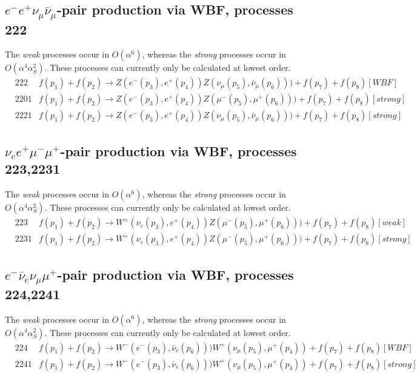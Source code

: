 \documentclass[12pt]{article}
\begin{document}
%
\subsection{$e^-e^+ \nu_{\mu} \bar\nu_{\mu} $-pair production via WBF, processes 222}
The {\it weak} processes occur in $O(\alpha^6)$, whereas the {\it strong} processes occur in $O(\alpha^4 \alpha_S^2)$.
These processes can currently only be calculated at lowest order.
\begin{eqnarray}
&222 &  f(p_1)+f(p_2) \to Z(e^-(p_3),e^+(p_4))Z(\nu_\mu(p_5),\bar{\nu}_\mu(p_6)))+f(p_7)+f(p_8) [WBF]  \nonumber \\
&2201 & f(p_1)+f(p_2) \to Z(e^-(p_3),e^+(p_4))Z(\mu^-(p_5),\mu^+(p_6)))+f(p_7)+f(p_8) [strong] \nonumber \\
&2221 & f(p_1)+f(p_2) \to Z(e^-(p_3),e^+(p_4))Z(\nu_\mu(p_5),\bar{\nu}_\mu(p_6)))+f(p_7)+f(p_8) [strong]  \nonumber
\end{eqnarray}
%
\subsection{$\nu_e  e^+ \mu^- \mu^+$-pair production via WBF, processes 223,2231}
The {\it weak} processes occur in $O(\alpha^6)$, whereas the {\it strong} processes occur in $O(\alpha^4 \alpha_S^2)$.
These processes can currently only be calculated at lowest order.
\begin{eqnarray}
& 223  & f(p_1)+f(p_2) \to W^+(\nu_e(p_3),e^+(p_4))Z(\mu^-(p_5),\mu^+(p_6)))+f(p_7)+f(p_8) [weak]  \nonumber \\
& 2231 & f(p_1)+f(p_2) \to W^+(\nu_e(p_3),e^+(p_4))Z(\mu^-(p_5),\mu^+(p_6)))+f(p_7)+f(p_8) [strong]  \nonumber
\end{eqnarray}

\subsection{$e^- \bar\nu_{e} \nu_{\mu} \mu^+$-pair production via WBF, processes 224,2241}
The {\it weak} processes occur in $O(\alpha^6)$, whereas the {\it strong} processes occur in $O(\alpha^4 \alpha_S^2)$.
These processes can currently only be calculated at lowest order.
\begin{eqnarray}
&224   & f(p_1)+f(p_2) \to W^-(e^-(p_3),\bar{\nu}_e(p_6)))W^+(\nu_\mu(p_5),\mu^+(p_4))+f(p_7)+f(p_8) [WBF]    \nonumber \\
&2241  & f(p_1)+f(p_2) \to W^-(e^-(p_3),\bar{\nu}_e(p_6)))W^+(\nu_\mu(p_5),\mu^+(p_4))+f(p_7)+f(p_8) [strong]  \nonumber   
\end{eqnarray}
%
\end{document}
